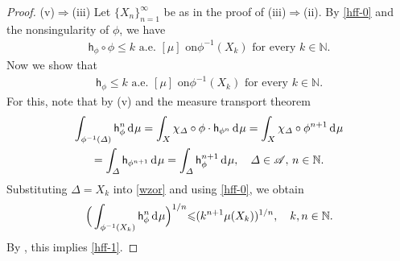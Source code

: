 \documentclass[draft,reqno]{amsproc}
\numberwithin{equation}{section}
\theoremstyle{remark}
\theoremstyle{definition}
\begin{document}
\begin{proof}
(v)$\Rightarrow$(iii) Let $\{X_n\}_{n=1}^\infty$ be as
in the proof of (iii)$\Rightarrow$(ii). By
\eqref{hff-0} and the nonsingularity of $\phi$, we
have
   \begin{align} \label{wineq}
\text{${\mathsf h}_{\phi} \circ \phi {\leqslant} k$ a.e.\ $[\mu]$ on
$\phi^{-1}(X_k)$ for every $k\in {\mathbb N}$.}
   \end{align}
Now we show that
   \begin{align} \label{hff-1}
{\mathsf h}_{\phi} {\leqslant} k \text{ a.e.\ $[\mu]$ on
$\phi^{-1}(X_k)$ for every $k \in {\mathbb N}$.}
   \end{align}
For this, note that by (v) and the measure transport
theorem
   \begin{multline} \label{wzor}
\int_{\phi^{-1}(\varDelta)} {\mathsf h}_{\phi}^n \operatorname{d\hspace{-0.25ex}} \mu =
\int_X \chi_{\varDelta} \circ \phi \cdot {\mathsf h}_{\phi^n}
\operatorname{d\hspace{-0.25ex}} \mu = \int_{X} \chi_{\varDelta} \circ \phi^{n+1} \operatorname{d\hspace{-0.25ex}}
\mu
   \\
= \int_{\varDelta} {\mathsf h}_{\phi^{n+1}} \operatorname{d\hspace{-0.25ex}} \mu =
\int_{\varDelta} {\mathsf h}_{\phi}^{n+1} \operatorname{d\hspace{-0.25ex}} \mu, \quad
\varDelta \in {\mathscr A}, \, n\in {\mathbb N}.
   \end{multline}
Substituting $\varDelta = X_k$ into \eqref{wzor} and
using \eqref{hff-0}, we obtain
   \begin{align} \label{szyb}
\Big(\int_{\phi^{-1}(X_k)} {\mathsf h}_{\phi}^n \operatorname{d\hspace{-0.25ex}}
\mu\Big)^{1/n} {\leqslant} (k^{n+1} \mu(X_k))^{1/n}, \quad k,n
\in {\mathbb N}.
   \end{align}
By \cite[p.\ 95, Problem 9]{Ash}, this implies
\eqref{hff-1}.


\end{proof}
\end{document}
